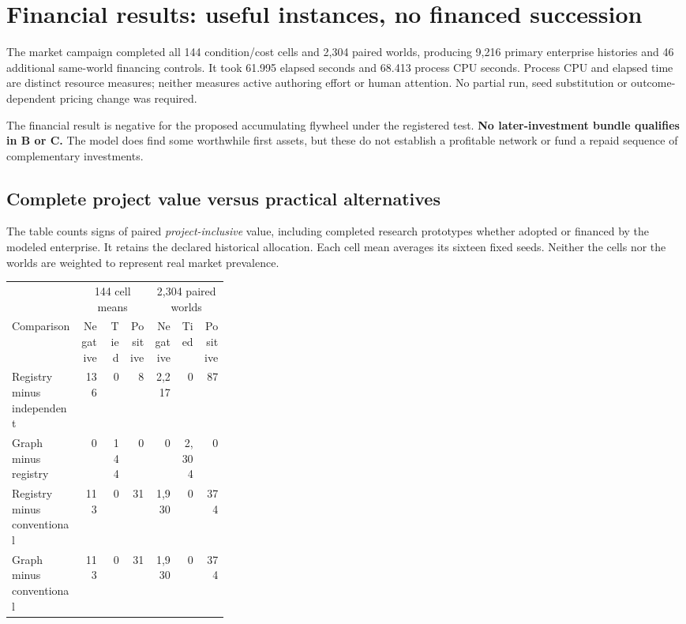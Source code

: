 \section{Financial results: useful instances, no financed succession}

The market campaign completed all 144 condition/cost cells and 2,304 paired worlds, producing 9,216 primary enterprise histories and 46 additional same-world financing controls. It took 61.995 elapsed seconds and 68.413 process CPU seconds. Process CPU and elapsed time are distinct resource measures; neither measures active authoring effort or human attention. No partial run, seed substitution or outcome-dependent pricing change was required.

The financial result is negative for the proposed accumulating flywheel under the registered test. \textbf{No later-investment bundle qualifies in B or C.} The model does find some worthwhile first assets, but these do not establish a profitable network or fund a repaid sequence of complementary investments.

\subsection{Complete project value versus practical alternatives}

The table counts signs of paired \emph{project-inclusive} value, including completed research prototypes whether adopted or financed by the modeled enterprise. It retains the declared historical allocation. Each cell mean averages its sixteen fixed seeds. Neither the cells nor the worlds are weighted to represent real market prevalence.

\begin{center}
\small
\begin{tabular}{p{0.32\linewidth}rrr rrr}
\toprule
 & \multicolumn{3}{c}{144 cell means} & \multicolumn{3}{c}{2,304 paired worlds}\\
Comparison & Negative & Tied & Positive & Negative & Tied & Positive\\
\midrule
Registry minus independent & 136 & 0 & 8 & 2,217 & 0 & 87\\
Graph minus registry & 0 & 144 & 0 & 0 & 2,304 & 0\\
Registry minus conventional & 113 & 0 & 31 & 1,930 & 0 & 374\\
Graph minus conventional & 113 & 0 & 31 & 1,930 & 0 & 374\\
\bottomrule
\end{tabular}
\end{center}

